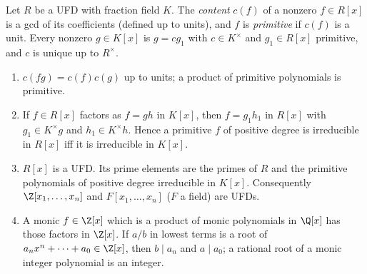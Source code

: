 \begin{theorem}\label{thm:rings:gauss-lemma}
Let $R$ be a UFD with fraction field $K$. The \emph{content} $c(f)$ of a nonzero $f\in R[x]$ is a gcd of its coefficients (defined up to
units), and $f$ is \emph{primitive} if $c(f)$ is a unit. Every nonzero $g\in K[x]$ is $g=cg_1$ with $c\in K^\times$ and $g_1\in R[x]$ primitive, and $c$
is unique up to $R^\times$.
\begin{enumerate}[label=(\roman*)]
\item $c(fg)=c(f)c(g)$ up to units; a product of primitive polynomials is primitive.
\item If $f\in R[x]$ factors as $f=gh$ in $K[x]$, then $f=g_1h_1$ in $R[x]$ with $g_1\in K^\times g$ and $h_1\in K^\times h$. Hence a primitive $f$ of positive
degree is irreducible in $R[x]$ iff it is irreducible in $K[x]$.
\item $R[x]$ is a UFD. Its prime elements are the primes of $R$ and the primitive polynomials of positive degree irreducible in
$K[x]$. Consequently $\Z[x_1,\dots,x_n]$ and $F[x_1,\dots,x_n]$ ($F$ a field) are UFDs.
\item A monic $f\in\Z[x]$ which is a product of monic polynomials in $\Q[x]$ has those factors in $\Z[x]$. If $a/b$ in lowest terms is a
root of $a_nx^n+\dots+a_0\in\Z[x]$, then $b\mid a_n$ and $a\mid a_0$; a rational root of a monic integer polynomial is an integer.
\end{enumerate}
\end{theorem}

